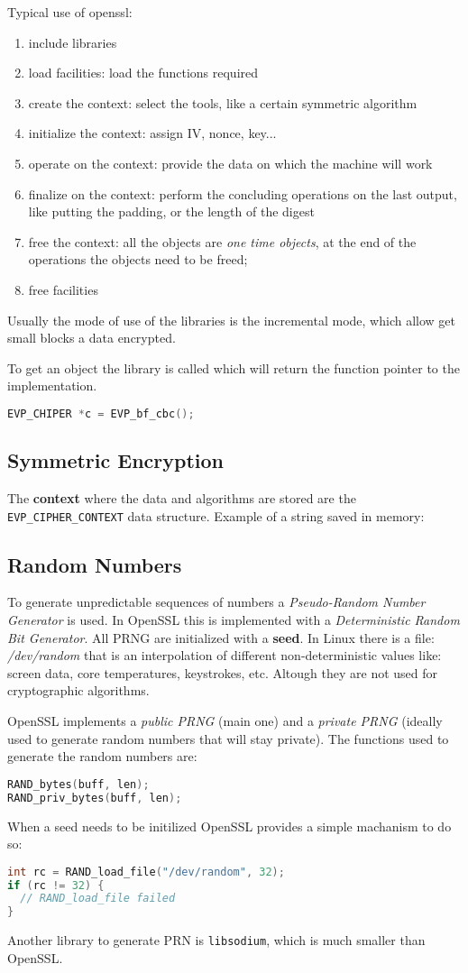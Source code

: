 \documentclass[12pt]{article}
\begin{document}
Typical use of openssl:
\begin{enumerate}
  \item include libraries
  \item load facilities: load the functions required
  \item create the context: select the tools, like a certain symmetric algorithm
  \item initialize the context: assign IV, nonce, key...
  \item operate on the context: provide the data on which the machine will work
  \item finalize on the context: perform the concluding operations on the last output, like putting the padding, or the length of the digest
  \item free the context: all the objects are \emph{one time objects}, at the end of the operations the objects need to be freed;
  \item free facilities
\end{enumerate}
Usually the mode of use of the libraries is the incremental mode, which allow get small blocks a data encrypted.

To get an object the library is called which will return the function pointer to the implementation.
\begin{lstlisting}[language=c]
EVP_CHIPER *c = EVP_bf_cbc();
\end{lstlisting}


\subsection{Symmetric Encryption}
The \textbf{context} where the data and algorithms are stored are the \texttt{EVP_CIPHER_CONTEXT} data structure. 
Example of a string saved in memory:


\subsection{Random Numbers}
To generate unpredictable sequences of numbers a \emph{Pseudo-Random Number Generator} is used. In OpenSSL this is implemented with a \emph{Deterministic Random Bit Generator}. All PRNG are initialized with a \textbf{seed}. In Linux there is a file: \emph{/dev/random} that is an interpolation of different non-deterministic values like: screen data, core temperatures, keystrokes, etc. Altough they are not used for cryptographic algorithms.


OpenSSL implements a \emph{public PRNG} (main one) and a \emph{private PRNG} (ideally used to generate random numbers that will stay private). The functions used to generate the random numbers are:
\begin{lstlisting}[language=c]
RAND_bytes(buff, len);
RAND_priv_bytes(buff, len);
\end{lstlisting}
When a seed needs to be initilized OpenSSL provides a simple machanism to do so:
\begin{lstlisting}[language=c]
int rc = RAND_load_file("/dev/random", 32);
if (rc != 32) {
  // RAND_load_file failed 
}
\end{lstlisting}
Another library to generate PRN is \texttt{libsodium}, which is much smaller than OpenSSL.
\end{document}
